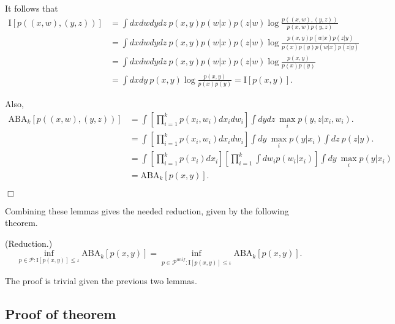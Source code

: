 It follows that
\begin{align*}
\text{I}[p((x,w), (y,z))] &= \int dx dw dy dz  \ p(x,y)p(w|x)p(z|w) \log \frac{p((x,w), (y,z))}{p(x,w)p(y,z)}
\\&= \int dx dw dy dz \ p(x,y)p(w|x)p(z|w) \log \frac{p(x, y)p(w|x)p(z|y)}{p(x)p(y)p(w|x)p(z|y)}
\\&= \int dx dw dy dz \ p(x,y)p(w|x)p(z|w) \log \frac{p(x, y)}{p(x)p(y)}
\\&= \int dx dy \ p(x,y) \log \frac{p(x, y)}{p(x)p(y)} = \text{I}[p(x,y)].
\end{align*}

Also,
\begin{align*}
\text{ABA}_k[p((x,w),(y,z))] 
&= \int \left[\prod_{i=1}^k p(x_i, w_i) dx_i dw_i \right] \int dy dz \ \max_i p(y,z|x_i, w_i).
\\&= \int \left[\prod_{i=1}^k p(x_i, w_i) dx_i dw_i \right] \int dy \ \max_i p(y|x_i) \int dz \ p(z|y).
\\&= \int \left[\prod_{i=1}^k p(x_i) dx_i \right] \left[\prod_{i=1}^k \int dw_i p(w_i|x_i)\right] \int dy \ \max_i p(y|x_i)
\\&= \text{ABA}_k[p(x,y)].
\end{align*}

$\Box$


Combining these lemmas gives the needed reduction, given by the following theorem.

\begin{theorem}\label{theorem:reduction} (Reduction.)
\[
\inf_{p \in \mathcal{P}: \text{I}[p(x,y)] \leq \iota} \text{ABA}_k[p(x,y)] = 
\inf_{p \in \mathcal{P}^{unif}: \text{I}[p(x,y)] \leq \iota} \text{ABA}_k[p(x,y)].
\]
\end{theorem}

The proof is trivial given the previous two lemmas.



\subsection{Proof of theorem}

